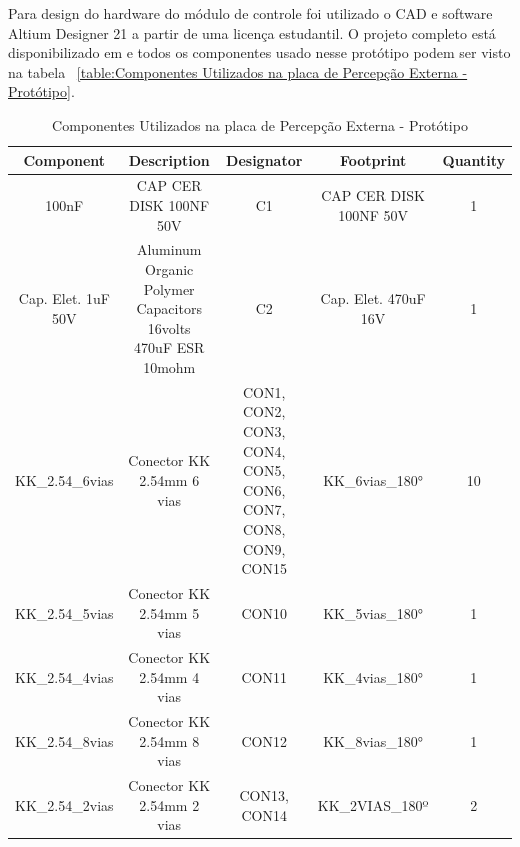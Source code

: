 \documentclass[../delivery_hospital_report.tex]{subfiles}
\begin{document}
Para design do hardware do módulo de controle foi utilizado o CAD e software Altium Designer 21 \cite{altium21} a partir de uma licença estudantil. O projeto completo está disponibilizado em \cite{github_modulos} e todos os componentes usado nesse protótipo podem ser visto na tabela ~\ref{table:Componentes Utilizados na placa de Percepção Externa - Protótipo}.

\begin{table}[!ht]
\caption{Componentes Utilizados na placa de Percepção Externa - Protótipo}
\centering
\begin{adjustbox}{width=\columnwidth,center}
\begin{tabular}{|c|c|c|c|c|}
\hline
Component                     & Description                                                    & Designator                                                    & Footprint                   & Quantity \\ \hline
100nF                       & CAP CER DISK 100NF   50V                                       & C1                                                            & CAP CER DISK 100NF   50V    & 1        \\ \hline
Cap. Elet. 1uF   50V        & Aluminum Organic   Polymer Capacitors 16volts 470uF ESR 10mohm & C2                                                            & Cap. Elet. 470uF 16V        & 1        \\ \hline
KK\_2.54\_6vias             & Conector KK 2.54mm 6   vias                                    & CON1, CON2, CON3,   CON4, CON5, CON6, CON7, CON8, CON9, CON15 & KK\_6vias\_180°             & 10       \\ \hline
KK\_2.54\_5vias             & Conector KK 2.54mm 5   vias                                    & CON10                                                         & KK\_5vias\_180°             & 1        \\ \hline
KK\_2.54\_4vias             & Conector KK 2.54mm 4   vias                                    & CON11                                                         & KK\_4vias\_180°             & 1        \\ \hline
KK\_2.54\_8vias             & Conector KK 2.54mm 8   vias                                    & CON12                                                         & KK\_8vias\_180°             & 1        \\ \hline
KK\_2.54\_2vias             & Conector KK 2.54mm 2   vias                                    & CON13, CON14                                                  & KK\_2VIAS\_180º             & 2        \\ \hline

\end{tabular}
\end{adjustbox}
\end{table}
\end{document}

